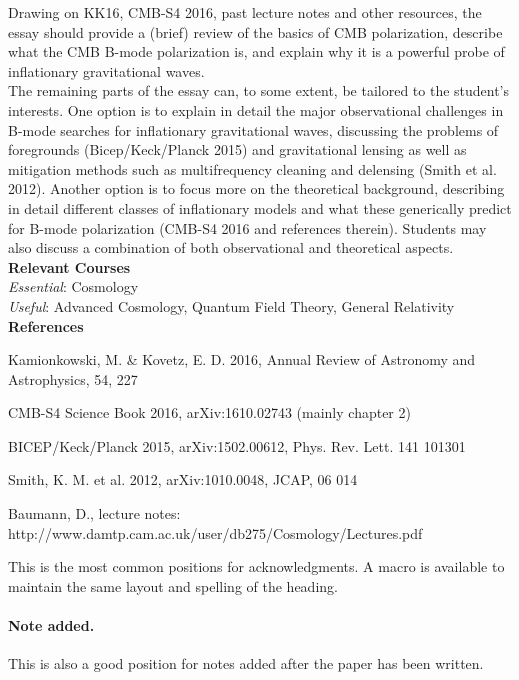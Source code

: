 \documentclass[a4paper,11pt]{article}
\begin{document}
Drawing on KK16, CMB-S4 2016, past lecture notes and other resources, the essay should provide a (brief) review of the basics of CMB polarization, describe what the CMB B-mode polarization is, and explain why it is a powerful probe of inflationary gravitational waves.\\

The remaining parts of the essay can, to some extent, be tailored to the student’s interests. One option is to explain in detail the major observational challenges in B-mode searches for inflationary gravitational waves, discussing the problems of foregrounds (Bicep/Keck/Planck 2015) and gravitational lensing as well as mitigation methods such as multifrequency cleaning and delensing (Smith et al. 2012). Another option is to focus more on the theoretical background, describing in detail different classes of inflationary models and what these generically predict for B-mode polarization (CMB-S4 2016 and references therein). Students may also discuss a combination of both observational and theoretical aspects.\\

\textbf{Relevant Courses}\\

\textit{Essential}: Cosmology\\

\textit{Useful}: Advanced Cosmology, Quantum Field Theory, General Relativity\\

\textbf{References}
\begin{enumerate}[label={[\arabic*]}]
\item {Kamionkowski, M. \& Kovetz, E. D. 2016, Annual Review of Astronomy and Astrophysics,
54, 227}
\item {CMB-S4 Science Book 2016, arXiv:1610.02743 (mainly chapter 2)}
\item {BICEP/Keck/Planck 2015, arXiv:1502.00612, Phys. Rev. Lett. 141 101301}
\item {Smith, K. M. et al. 2012, arXiv:1010.0048, JCAP, 06 014}
\item {Baumann, D., lecture notes: http://www.damtp.cam.ac.uk/user/db275/Cosmology/Lectures.pdf}
\end{enumerate}


\acknowledgments

This is the most common positions for acknowledgments. A macro is
available to maintain the same layout and spelling of the heading.

\paragraph{Note added.} This is also a good position for notes added
after the paper has been written.
\end{document}

